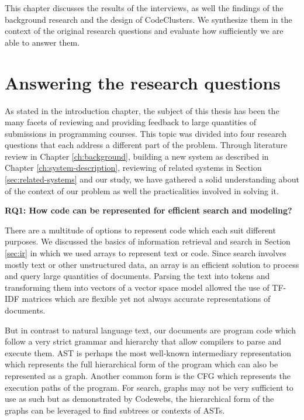 This chapter discusses the results of the interviews, as well the findings of the background research and the design of CodeClusters. We synthesize them in the context of the original research questions and evaluate how sufficiently we are able to answer them.

\section{Answering the research questions}

As stated in the introduction chapter, the subject of this thesis has been the many facets of reviewing and providing feedback to large quantities of submissions in programming courses. This topic was divided into four research questions that each address a different part of the problem. Through literature review in Chapter \ref{ch:background}, building a new system as described in Chapter \ref{ch:system-description}, reviewing of related systems in Section \ref{sec:related-systems} and our study, we have gathered a solid understanding about of the context of our problem as well the practicalities involved in solving it.

\bigskip
\noindent
\textbf{RQ1: How code can be represented for efficient search and modeling?}
\bigskip

\noindent
There are a multitude of options to represent code which each suit different purposes. We discussed the basics of information retrieval and search in Section \ref{sec:ir} in which we used arrays to represent text or code. Since search involves mostly text or other unstructured data, an array is an efficient solution to process and query large quantities of documents. Parsing the text into tokens and transforming them into vectors of a vector space model allowed the use of TF-IDF matrices which are flexible yet not always accurate representations of documents.

But in contrast to natural language text, our documents are program code which follow a very strict grammar and hierarchy that allow compilers to parse and execute them. AST is perhaps the most well-known intermediary representation which represents the full hierarchical form of the program which can also be represented as a graph. Another common form is the CFG which represents the execution paths of the program. For search, graphs may not be very sufficient to use as such but as demonstrated by Codewebs, the hierarchical form of the graphs can be leveraged to find subtrees or contexts of ASTs\cite{codewebs}.

